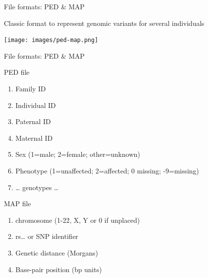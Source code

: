 \begin{frame}{File formats: PED \& MAP}

Classic format to represent genomic variants for several individuals

\centerline{\texttt{[image: images/ped-map.png]}}

\end{frame}

\begin{frame}{File formats: PED \& MAP}

\begin{block}{PED file}

\begin{enumerate}
\def\labelenumi{\arabic{enumi}.}
\itemsep1pt\parskip0pt
\item
  Family ID
\item
  Individual ID
\item
  Paternal ID
\item
  Maternal ID
\item
  Sex (1=male; 2=female; other=unknown)
\item
  Phenotype (1=unaffected; 2=affected; 0 missing; -9=missing)
\item
  \ldots{} genotypes \ldots{}
\end{enumerate}

\end{block}

\begin{block}{MAP file}

\begin{enumerate}
\def\labelenumi{\arabic{enumi}.}
\itemsep1pt\parskip0pt
\item
  chromosome (1-22, X, Y or 0 if unplaced)
\item
  rs\ldots{} or SNP identifier
\item
  Genetic distance (Morgans)
\item
  Base-pair position (bp units)
\end{enumerate}

\end{block}

\end{frame}

